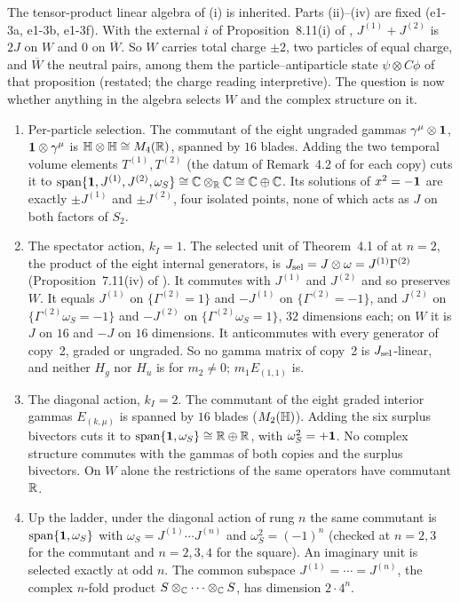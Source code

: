 The tensor-product linear algebra of (i) is inherited. Parts (ii)--(iv) are fixed (e1-3a, e1-3b, e1-3f). With the external $i$ of
Proposition~8.11(i) of \cite{RE}, $J^{(1)}+J^{(2)}$ is $2J$ on $W$ and $0$ on $\overline W$. So $W$ carries total charge $\pm2$, two particles
of equal charge, and $\overline W$ the neutral pairs, among them the particle--antiparticle state $\psi\otimes C\phi$ of that proposition
(restated; the charge reading interpretive). The question is now whether anything in the algebra selects $W$ and the complex
structure on it.

\begin{proposition}
\label{e1:prop:select}
\begin{enumerate}[label=(\roman*),leftmargin=2.2em]
\item Per-particle selection. The commutant of the eight ungraded gammas $\gamma^\mu\otimes\mathbf 1$, $\mathbf 1\otimes\gamma^\mu$ is $\mathbb{H}\otimes\mathbb{H}\cong M_4(\mathbb{R})$,
spanned by $16$ blades. Adding the two temporal volume elements $T^{(1)},T^{(2)}$ (the datum of Remark~4.2 of \cite{ES17} for each copy)
cuts it to $\operatorname{span}\{\mathbf 1,J^{(1)},J^{(2)},\omega_S\}\cong\mathbb{C}\otimes_{\mathbb{R}}\mathbb{C}\cong\mathbb{C}\oplus\mathbb{C}$. Its solutions of $x^2=-\mathbf 1$ are exactly
$\pm J^{(1)}$ and $\pm J^{(2)}$, four isolated points, none of which acts as $J$ on both factors of $S_2$.
\item The spectator action, $k_I=1$. The selected unit of Theorem~4.1 of \cite{ES17} at $n=2$, the product of the eight internal generators, is
$J_{\rm sel}=J\otimes\omega=J^{(1)}\Gamma^{(2)}$ (Proposition~7.11(iv) of \cite{RE}). It commutes with $J^{(1)}$ and $J^{(2)}$ and so preserves
$W$. It equals $J^{(1)}$ on $\{\Gamma^{(2)}=1\}$ and $-J^{(1)}$ on $\{\Gamma^{(2)}=-1\}$, and $J^{(2)}$ on $\{\Gamma^{(2)}\omega_S=-1\}$ and
$-J^{(2)}$ on $\{\Gamma^{(2)}\omega_S=1\}$, $32$ dimensions each; on $W$ it is $J$ on $16$ and $-J$ on $16$ dimensions. It anticommutes with every generator of copy~2, graded or ungraded. So no gamma matrix of copy~2 is $J_{\rm sel}$-linear,
and neither $H_g$ nor $H_u$ is for $m_2\neq0$; $m_1E_{(1,1)}$ is.
\item The diagonal action, $k_I=2$. The commutant of the eight graded interior gammas $E_{(k,\mu)}$ is spanned by $16$ blades ($M_2(\mathbb{H})$). Adding
the six surplus bivectors cuts it to $\operatorname{span}\{\mathbf 1,\omega_S\}\cong\mathbb{R}\oplus\mathbb{R}$, with $\omega_S^2=+\mathbf 1$. No complex structure commutes with
the gammas of both copies and the surplus bivectors. On $W$ alone the restrictions of the same operators have commutant $\mathbb{R}$.
\item Up the ladder, under the diagonal action of rung $n$ the same commutant is $\operatorname{span}\{\mathbf 1,\omega_S\}$ with
$\omega_S=J^{(1)}\cdots J^{(n)}$ and $\omega_S^2=(-1)^n$ (checked at $n=2,3$ for the commutant and $n=2,3,4$ for the square). An imaginary unit
is selected exactly at odd $n$. The common subspace $J^{(1)}=\cdots=J^{(n)}$, the complex $n$-fold product $S\otimes_{\mathbb{C}}\cdots\otimes_{\mathbb{C}} S$, has
dimension $2\cdot4^n$.
\end{enumerate}
\end{proposition}

